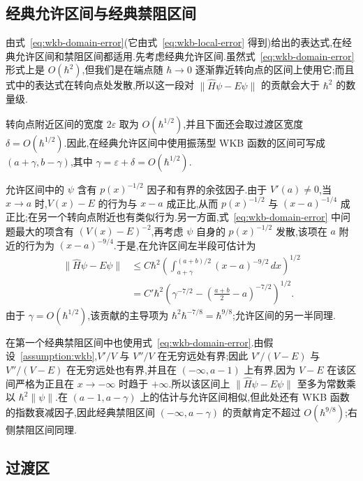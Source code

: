 \subsection{经典允许区间与经典禁阻区间}
\label{subsec:wkb-allowed-forbidden-error}

由式~\eqref{eq:wkb-domain-error}(它由式~\eqref{eq:wkb-local-error} 得到)给出的表达式,在经典允许区间和禁阻区间都适用.先考虑经典允许区间.虽然式~\eqref{eq:wkb-domain-error} 形式上是 $O(\hbar^2)$,但我们是在端点随 $\hbar\to0$ 逐渐靠近转向点的区间上使用它;而且式中的表达式在转向点处发散,所以这一段对 $\|\widehat H\psi-E\psi\|$ 的贡献会大于 $\hbar^2$ 的数量级.

转向点附近区间的宽度 $2\varepsilon$ 取为 $O(\hbar^{1/2})$,并且下面还会取过渡区宽度 $\delta=O(\hbar^{1/2})$.因此,在经典允许区间中使用振荡型 WKB 函数的区间可写成 $(a+\gamma,b-\gamma)$,其中 $\gamma=\varepsilon+\delta=O(\hbar^{1/2})$.

允许区间中的 $\psi$ 含有 $p(x)^{-1/2}$ 因子和有界的余弦因子.由于 $V'(a)\neq0$,当 $x\to a$ 时,$V(x)-E$ 的行为与 $x-a$ 成正比,从而 $p(x)^{-1/2}$ 与 $(x-a)^{-1/4}$ 成正比;在另一个转向点附近也有类似行为.另一方面,式~\eqref{eq:wkb-domain-error} 中问题最大的项含有 $(V(x)-E)^{-2}$,再考虑 $\psi$ 自身的 $p(x)^{-1/2}$ 发散,该项在 $a$ 附近的行为为 $(x-a)^{-9/4}$.于是,在允许区间左半段可估计为
\[
\begin{aligned}
\|\widehat H\psi-E\psi\|&\leq C\hbar^2
\left(\int_{a+\gamma}^{(a+b)/2}(x-a)^{-9/2}\,dx\right)^{1/2}\\
&=C'\hbar^2\left(\gamma^{-7/2}-\left(\frac{a+b}{2}-a\right)^{-7/2}\right)^{1/2}.
\end{aligned}
\]
由于 $\gamma=O(\hbar^{1/2})$,该贡献的主导项为 $\hbar^2\hbar^{-7/8}=\hbar^{9/8}$;允许区间的另一半同理.

在第一个经典禁阻区间中也使用式~\eqref{eq:wkb-domain-error}.由假设~\ref{assumption:wkb},$V'/V$ 与 $V''/V$ 在无穷远处有界;因此 $V'/(V-E)$ 与 $V''/(V-E)$ 在无穷远处也有界,并且在 $(-\infty,a-1)$ 上有界,因为 $V-E$ 在该区间严格为正且在 $x\to-\infty$ 时趋于 $+\infty$.所以该区间上 $\|\widehat H\psi-E\psi\|$ 至多为常数乘以 $\hbar^2\|\psi\|$.在 $(a-1,a-\gamma)$ 上的估计与允许区间相似,但此处还有 WKB 函数的指数衰减因子,因此经典禁阻区间 $(-\infty,a-\gamma)$ 的贡献肯定不超过 $O(\hbar^{9/8})$;右侧禁阻区间同理.

\subsection{过渡区}
\label{subsec:wkb-transition-regions}

